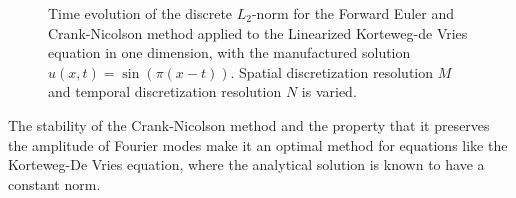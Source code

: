 \begin{figure}[!ht]
\caption{\label{norm_evolution}
  Time evolution of the discrete $L_2$-norm for the Forward Euler and Crank-Nicolson method applied to the Linearized Korteweg-de Vries equation in one dimension, with the manufactured solution  $u(x,t) = \sin(\pi(x-t))$.
  Spatial discretization resolution $M$ and temporal discretization resolution $N$ is varied.
}
\end{figure}

The stability of the Crank-Nicolson method and the property that it preserves the amplitude of Fourier modes make it an optimal method for equations like the Korteweg-De Vries equation, where the analytical solution is known to have a constant norm.
